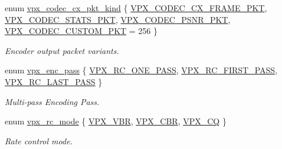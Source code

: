 \begin{DoxyCompactItemize}
\item 
enum \hyperlink{group__encoder_ga28a79375279536526552af3a83d2ed72}{vpx\-\_\-codec\-\_\-cx\-\_\-pkt\-\_\-kind} \{ \hyperlink{group__encoder_gga28a79375279536526552af3a83d2ed72a2261aae5594289400e812fb1e6b6b0cc}{\-V\-P\-X\-\_\-\-C\-O\-D\-E\-C\-\_\-\-C\-X\-\_\-\-F\-R\-A\-M\-E\-\_\-\-P\-K\-T}, 
\hyperlink{group__encoder_gga28a79375279536526552af3a83d2ed72a77cd8b95d9891bcce36117f5f31994fd}{\-V\-P\-X\-\_\-\-C\-O\-D\-E\-C\-\_\-\-S\-T\-A\-T\-S\-\_\-\-P\-K\-T}, 
\hyperlink{group__encoder_gga28a79375279536526552af3a83d2ed72a11eefa1328e6d22eb7c844645a260628}{\-V\-P\-X\-\_\-\-C\-O\-D\-E\-C\-\_\-\-P\-S\-N\-R\-\_\-\-P\-K\-T}, 
\hyperlink{group__encoder_gga28a79375279536526552af3a83d2ed72a7b54c122969397b1926de853d28b3c80}{\-V\-P\-X\-\_\-\-C\-O\-D\-E\-C\-\_\-\-C\-U\-S\-T\-O\-M\-\_\-\-P\-K\-T} =  256
 \}
\begin{DoxyCompactList}\small\item\em \-Encoder output packet variants. \end{DoxyCompactList}\item 
enum \hyperlink{group__encoder_ga476c5417f9c15a1dc5d3f68fa44c493f}{vpx\-\_\-enc\-\_\-pass} \{ \hyperlink{group__encoder_gga476c5417f9c15a1dc5d3f68fa44c493fa7b6943a41868e8e26a77e9500f139ca1}{\-V\-P\-X\-\_\-\-R\-C\-\_\-\-O\-N\-E\-\_\-\-P\-A\-S\-S}, 
\hyperlink{group__encoder_gga476c5417f9c15a1dc5d3f68fa44c493faa0765945345b160905f3b762986dae3b}{\-V\-P\-X\-\_\-\-R\-C\-\_\-\-F\-I\-R\-S\-T\-\_\-\-P\-A\-S\-S}, 
\hyperlink{group__encoder_gga476c5417f9c15a1dc5d3f68fa44c493fa65da543b956d6a9b1f301ab8cc90d3a7}{\-V\-P\-X\-\_\-\-R\-C\-\_\-\-L\-A\-S\-T\-\_\-\-P\-A\-S\-S}
 \}
\begin{DoxyCompactList}\small\item\em \-Multi-\/pass \-Encoding \-Pass. \end{DoxyCompactList}\item 
enum \hyperlink{group__encoder_gaf50e74d91be4cae6f70dfeba5b7410d2}{vpx\-\_\-rc\-\_\-mode} \{ \hyperlink{group__encoder_ggaf50e74d91be4cae6f70dfeba5b7410d2ab8fbe4441ed3f31a167c8194e8a64f87}{\-V\-P\-X\-\_\-\-V\-B\-R}, 
\hyperlink{group__encoder_ggaf50e74d91be4cae6f70dfeba5b7410d2a8b02853cb35790d60cc171a11f6c268a}{\-V\-P\-X\-\_\-\-C\-B\-R}, 
\hyperlink{group__encoder_ggaf50e74d91be4cae6f70dfeba5b7410d2a5f2fd02b55c67d62bfd79380bcb03f63}{\-V\-P\-X\-\_\-\-C\-Q}
 \}
\begin{DoxyCompactList}\small\item\em \-Rate control mode. \end{DoxyCompactList}\item 

\end{DoxyCompactItemize}
